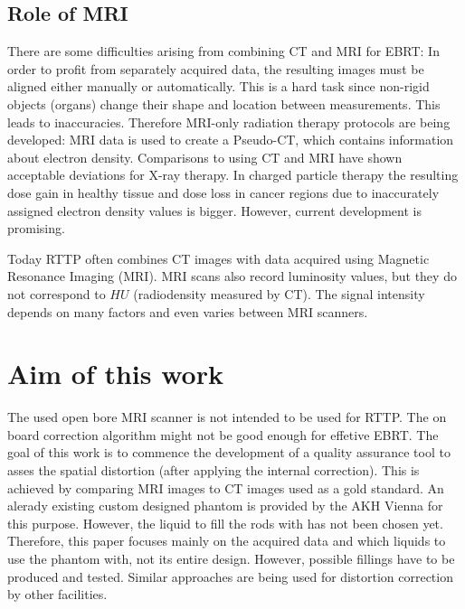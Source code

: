 \subsection{Role of MRI}
There are some difficulties arising from combining CT and MRI for EBRT:
In order to profit from separately acquired data, the resulting images must be aligned either manually or automatically. This is a hard task since non-rigid objects (organs) change their shape and location between measurements. This leads to inaccuracies.
Therefore MRI-only radiation therapy protocols are being developed:
MRI data is used to create a Pseudo-CT, which contains information about electron density. Comparisons to using CT and MRI have shown acceptable deviations for X-ray therapy.
In charged particle therapy the resulting dose gain in healthy tissue and dose loss in cancer regions due to inaccurately assigned electron density values is bigger.
However, current development is promising. \cite{Rank2013, Stanescu2006, Nyholm2015, Greer2015, Chen2004}


Today RTTP often combines CT images with data acquired using Magnetic Resonance Imaging (MRI).
MRI scans also record luminosity values, but they do not correspond to $HU$ (radiodensity measured by CT).
The signal intensity depends on many factors and even varies between MRI scanners.



\section{Aim of this work}
The used open bore MRI scanner is not intended to be used for RTTP. The on board correction algorithm might not be good enough for effetive EBRT.
The goal of this work is to commence the development of a quality assurance tool to asses the spatial distortion (after applying the internal correction).
This is achieved by comparing MRI images to CT images used as a gold standard.
An alerady existing custom designed phantom is provided by the AKH Vienna for this purpose.
However, the liquid to fill the rods with has not been chosen yet.
Therefore, this paper focuses mainly on the acquired data and which liquids to use the phantom with, not its entire design.
However, possible fillings have to be produced and tested.
Similar approaches are being used for distortion correction by other facilities. \cite{Price2015, Petersch2004, Torfeh2015, Wang2004, Wang2004b, Mizowaki2000}




\newpage